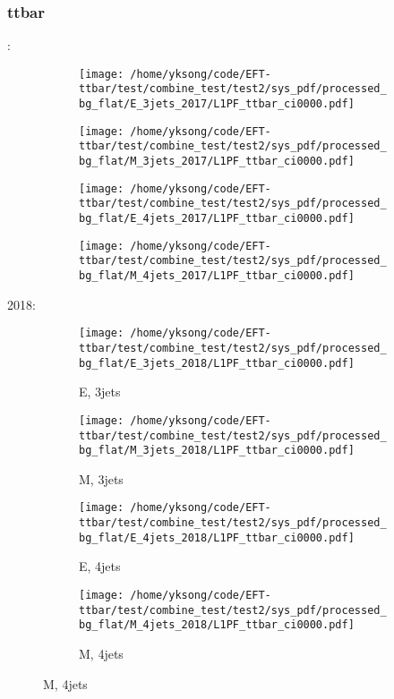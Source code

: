 \documentclass{beamer}
\begin{document}
\begin{frame}
\frametitle{ttbar}
\fontsize{5}{1}:
\begin{figure}
\centering
\begin{subfigure}[b]{0.24\textwidth}
\texttt{[image: /home/yksong/code/EFT-ttbar/test/combine\_test/test2/sys\_pdf/processed\_bg\_flat/E\_3jets\_2017/L1PF\_ttbar\_ci0000.pdf]}
\end{subfigure}
\begin{subfigure}[b]{0.24\textwidth}
\texttt{[image: /home/yksong/code/EFT-ttbar/test/combine\_test/test2/sys\_pdf/processed\_bg\_flat/M\_3jets\_2017/L1PF\_ttbar\_ci0000.pdf]}
\end{subfigure}
\begin{subfigure}[b]{0.24\textwidth}
\texttt{[image: /home/yksong/code/EFT-ttbar/test/combine\_test/test2/sys\_pdf/processed\_bg\_flat/E\_4jets\_2017/L1PF\_ttbar\_ci0000.pdf]}
\end{subfigure}
\begin{subfigure}[b]{0.24\textwidth}
\texttt{[image: /home/yksong/code/EFT-ttbar/test/combine\_test/test2/sys\_pdf/processed\_bg\_flat/M\_4jets\_2017/L1PF\_ttbar\_ci0000.pdf]}
\end{subfigure}
\end{figure}
2018:
\begin{figure}
\centering
\begin{subfigure}[b]{0.24\textwidth}
\texttt{[image: /home/yksong/code/EFT-ttbar/test/combine\_test/test2/sys\_pdf/processed\_bg\_flat/E\_3jets\_2018/L1PF\_ttbar\_ci0000.pdf]}
\captionsetup{font=tiny}
\caption{E, 3jets}
\end{subfigure}
\begin{subfigure}[b]{0.24\textwidth}
\texttt{[image: /home/yksong/code/EFT-ttbar/test/combine\_test/test2/sys\_pdf/processed\_bg\_flat/M\_3jets\_2018/L1PF\_ttbar\_ci0000.pdf]}
\captionsetup{font=tiny}
\caption{M, 3jets}
\end{subfigure}
\begin{subfigure}[b]{0.24\textwidth}
\texttt{[image: /home/yksong/code/EFT-ttbar/test/combine\_test/test2/sys\_pdf/processed\_bg\_flat/E\_4jets\_2018/L1PF\_ttbar\_ci0000.pdf]}
\captionsetup{font=tiny}
\caption{E, 4jets}
\end{subfigure}
\begin{subfigure}[b]{0.24\textwidth}
\texttt{[image: /home/yksong/code/EFT-ttbar/test/combine\_test/test2/sys\_pdf/processed\_bg\_flat/M\_4jets\_2018/L1PF\_ttbar\_ci0000.pdf]}
\captionsetup{font=tiny}
\caption{M, 4jets}
\end{subfigure}
\end{figure}
\end{frame}
\end{document}
